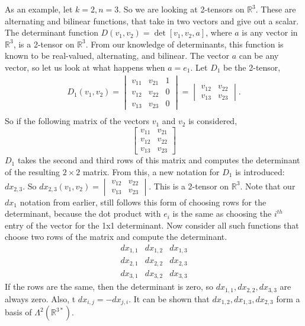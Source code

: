 \documentclass{article}
\begin{document}
As an example, let $k=2, n=3$. So we are looking at 2-tensors on $\mathbb{R}^3$. These are alternating and bilinear functions, that take in two vectors and give out a scalar. The determinant function $D(v_1, v_2) = \det[v_1, v_2, a]$, where $a$ is any vector in $\mathbb{R}^3$, is a 2-tensor on $\mathbb{R}^3$. From our knowledge of determinants, this function is known to be real-valued, alternating, and bilinear. The vector $a$ can be any vector, so let us look at what happens when $a = e_1$. Let $D_1$ be the 2-tensor,
\begin{align*}
    D_1(v_1, v_2) = \begin{vmatrix}
        v_{11} & v_{21} & 1\\
        v_{12} & v_{22} & 0\\
        v_{13} & v_{23} & 0
    \end{vmatrix} = \begin{vmatrix}
        v_{12} & v_{22}\\
        v_{13} & v_{23}
    \end{vmatrix}.\\
\end{align*}
So if the following matrix of the vectors $v_1$ and $v_2$ is considered, 
\[
    \begin{bmatrix}
        v_{11} & v_{21}\\
        v_{12} & v_{22}\\
        v_{13} & v_{23}
    \end{bmatrix}
\]
$D_1$ takes the second and third rows of this matrix and computes the determinant of the resulting $2\times2$ matrix. From this, a new notation for $D_1$ is introduced: $dx_{2,3}$. So $dx_{2,3}(v_1, v_2) = \begin{vmatrix}
    v_{12} & v_{22}\\
    v_{13} & v_{23}
\end{vmatrix}$. This is a 2-tensor on $\mathbb{R}^3$. Note that our $dx_1$ notation from earlier, still follows this form of choosing rows for the determinant, because the dot product with $e_i$ is the same as choosing the $i^{th}$ entry of the vector for the 1x1 determinant. 
Now consider all such functions that choose two rows of the matrix and compute the determinant.
\[
\begin{array}{ccc}
    dx_{1,1} & dx_{1,2} & dx_{1,3}\\
    dx_{2,1} & dx_{2,2} & dx_{2,3}\\
    dx_{3,1} & dx_{3,2} & dx_{3,3}
\end{array}
\]
If the rows are the same, then the determinant is zero, so $dx_{1,1}, dx_{2,2}, dx_{3,3}$ are always zero. Also, t $dx_{i,j} = -dx_{j,i}$. It can be shown that $dx_{1,2}, dx_{1,3}, dx_{2,3}$ form a basis of $\Lambda^2(\mathbb{R}^{3*})$. 
\end{document}

